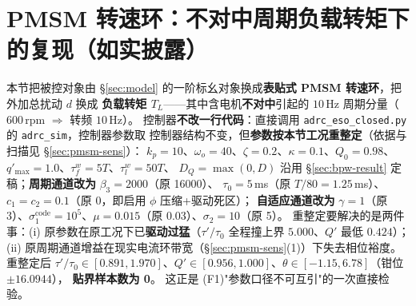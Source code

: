 \documentclass[11pt]{article}
\theoremstyle{remark}\newtheorem{remark}{注}
\begin{document}
\section{PMSM 转速环：不对中周期负载转矩下的复现（如实披露）}\label{sec:pmsm}
本节把被控对象由 §\ref{sec:model} 的一阶标幺对象换成\textbf{表贴式 PMSM 转速环}，把外加总扰动 $d$ 换成
\textbf{负载转矩 $T_L$}——其中含电机\textbf{不对中}引起的 $10$\,Hz 周期分量（$600$\,rpm $\Rightarrow$ 转频 $10$\,Hz）。
控制器\textbf{不改一行代码}：直接调用 \texttt{adrc\_eso\_closed.py} 的 \texttt{adrc\_sim}，控制器参数取
控制器结构不变，但\textbf{参数按本节工况重整定}（依据与扫描见 §\ref{sec:pmsm-sens}）：
$k_p=10$、$\omega_o=40$、$\zeta=0.2$、$\kappa=0.1$、$Q_0=0.98$、$q'_{\max}=1.0$、$\tau_f^w=5T$、$\tau_l^w=50T$、
$D_Q=\max(0,D)$ 沿用 §\ref{sec:bpw-result} 定稿；\textbf{周期通道改为} $\beta_3=2000$（原 16000）、
$\tau_0=5$\,ms（原 $T/80=1.25$\,ms）、$c_1=c_2=0.1$（原 0，即启用 $\phi$ 压缩+驱动死区）；
\textbf{自适应通道改为} $\gamma=1$（原 3）、$\sigma_1^{\mathrm{code}}=10^{5}$、$\mu=0.015$（原 0.03）、$\sigma_2=10$（原 5）。
重整定要解决的是两件事：(i) 原参数在原工况下已\textbf{驱动过猛}（$\tau'/\tau_0$ 全程撞上界 $5.000$、$Q'$ 最低 $0.424$）；
(ii) 原周期通道增益在现实电流环带宽（§\ref{sec:pmsm-sens}(1)）下失去相位裕度。
重整定后 $\tau'/\tau_0\in[0.891,1.970]$、$Q'\in[0.956,1.000]$、$\theta\in[-1.15,6.78]$（钳位 $\pm16.0944$），
\textbf{贴界样本数为 0}。
这正是 (F1)"参数口径不可互引"的一次直接检验。

\vspace{1mm}
\noindent{}
\end{document}
